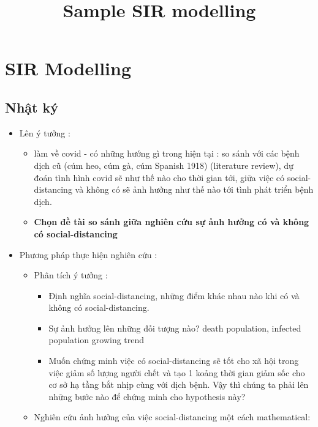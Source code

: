 \documentclass[11pt]{article}
\title{Sample SIR modelling}
\providecommand{\tightlist}{%
      \setlength{\itemsep}{0pt}\setlength{\parskip}{0pt}}
\begin{document}
    
    
    \maketitle
    
    

    
    \section{SIR Modelling}\label{sir-modelling}

\subsection{Nhật ký}\label{nhuxe2t-ky}

\begin{itemize}
\tightlist
\item
  Lên ý tưởng :

  \begin{itemize}
  \tightlist
  \item
    làm về covid - có những hướng gì trong hiện tại : so sánh với các
    bệnh dịch cũ (cúm heo, cúm gà, cúm Spanish 1918) (literature
    review), dự đoán tình hình covid sẽ như thế nào cho thời gian tới,
    giữa việc có social-distancing và không có sẽ ảnh hưởng như thế nào
    tới tình phát triển bệnh dịch.
  \item
    \textbf{Chọn đề tài so sánh giữa nghiên cứu sự ảnh hưởng có và không
    có social-distancing}
  \end{itemize}
\item
  Phương pháp thực hiện nghiên cứu :

  \begin{itemize}
  \tightlist
  \item
    Phân tích ý tưởng :

    \begin{itemize}
    \tightlist
    \item
      Định nghĩa social-distancing, những điểm khác nhau nào khi có và
      không có social-distancing.
    \item
      Sự ảnh hưởng lên những đối tượng nào? death population, infected
      population growing trend
    \item
      Muốn chứng minh việc có social-distancing sẽ tốt cho xã hội trong
      việc giảm số lượng người chết và tạo 1 koảng thời gian giảm sốc
      cho cơ sở hạ tầng bắt nhịp cùng với dịch bệnh. Vậy thì chúng ta
      phải lên những bước nào để chứng minh cho hypothesis này?
    \end{itemize}
  \item
    Nghiên cứu ảnh hưởng của việc social-distancing một cách
    mathematical:


\end{itemize}
\end{itemize}
\end{document}
